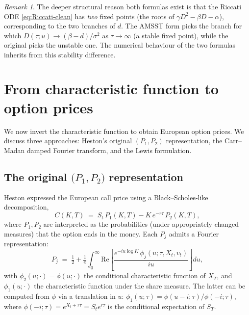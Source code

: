 \documentclass[11pt]{article}
\theoremstyle{plain}
\theoremstyle{definition}
\theoremstyle{remark}
\newtheorem{remark}[theorem]{Remark}
\begin{document}
\begin{remark}
    The deeper structural reason both formulas exist is that the Riccati ODE \eqref{eq:Riccati-clean} has \emph{two} fixed points (the roots of \(\gamma D^2 - \beta D - \alpha\)), corresponding to the two branches of \(d\). The AMSST form picks the branch for which \(D(\tau; u) \to (\beta - d)/\sigma^2\) as \(\tau \to \infty\) (a stable fixed point), while the original picks the unstable one. The numerical behaviour of the two formulas inherits from this stability difference.
\end{remark}

\section{From characteristic function to option prices}

We now invert the characteristic function to obtain European option prices. We discuss three approaches: Heston's original \((P_1, P_2)\) representation, the Carr--Madan damped Fourier transform, and the Lewis formulation.

\subsection{The original \(\bigl(P_1, P_2\bigr)\) representation}

Heston \cite{Heston1993} expressed the European call price using a Black--Scholes-like decomposition,
\begin{equation}
    C(K, T) \;=\; S_t\, P_1(K, T) - K\, e^{-r\tau}\, P_2(K, T),                                       \label{eq:heston-P1P2}
\end{equation}
where \(P_1, P_2\) are interpreted as the probabilities (under appropriately changed measures) that the option ends in the money. Each \(P_j\) admits a Fourier representation:
\begin{equation}
    P_j \;=\; \tfrac12 + \tfrac{1}{\pi} \int_0^\infty \mathrm{Re}\!\left[\frac{e^{-i u \log K}\,\phi_j(u; \tau, X_t, v_t)}{i u}\right] du,                          \label{eq:Pj}
\end{equation}
with \(\phi_2(u; \cdot) = \phi(u; \cdot)\) the conditional characteristic function of \(X_T\), and \(\phi_1(u; \cdot)\) the characteristic function under the share measure. The latter can be computed from \(\phi\) via a translation in \(u\): \(\phi_1(u; \tau) = \phi(u - i; \tau)/\phi(-i; \tau)\), where \(\phi(-i; \tau) = e^{X_t + r \tau} = S_t e^{r\tau}\) is the conditional expectation of \(S_T\).
\end{document}
